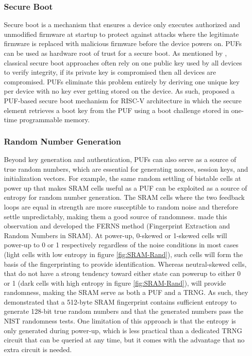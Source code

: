 \subsubsection{Secure Boot}
Secure boot is a mechanism that ensures a device only executes authorized and unmodified firmware at startup to protect against attacks where the legitimate firmware is replaced with malicious firmware before the device powers on. PUFs can be used as hardware root of trust for a secure boot. As mentioned by \cite{SecureBootPUF2024}, classical secure boot approaches often rely on one public key used by all devices to verify integrity, if its private key is compromised then all devices are compromised. PUFs eliminate this problem entirely by deriving one unique key per device with no key ever getting stored on the device. As such, \cite{SecureBootPUF2024} proposed a PUF-based secure boot mechanism for RISC-V architecture in which the secure element retrieves a boot key from the PUF using a boot challenge stored in one-time programmable memory.

\subsubsection{Random Number Generation}
Beyond key generation and authentication, PUFs can also serve as a source of true random numbers, which are essential for generating nonces, session keys, and initialization vectors. For example, the same random settling of bistable cells at power up that makes SRAM cells useful as a PUF can be exploited as a source of entropy for random number generation. The SRAM cells where the two feedback loops are equal in strength are more susceptible to random noise and therefore settle unpredictably, making them a good source of randomness. \cite{4674345} made this observation and developed the FERNS method (Fingerprint Extraction and Random Numbers in SRAM). At power-up, 0-skewed or 1-skewed cells will power-up to 0 or 1 respectively regardless of the noise conditions in most cases (light cells with low entropy in figure \ref{fig:SRAM-Rand}), such cells will form the basis of the fingerprinting to provide identification. Whereas neutral-skewed cells, that do not have a strong tendency toward either state can powerup to either 0 or 1 (dark cells with high entropy in figure \ref{fig:SRAM-Rand}), will provide randomness, making the SRAM serve as both a PUF and a TRNG. As such, they demonstrated that a 512-byte SRAM fingerprint contains sufficient entropy to generate 128-bit true random numbers and that the generated numbers pass the NIST randomness tests. One limitation of this approach is that the entropy is only generated during power-up, which is less practical than a dedicated TRNG circuit that can be queried at any time, but it comes with the advantage that no extra circuit is needed.

